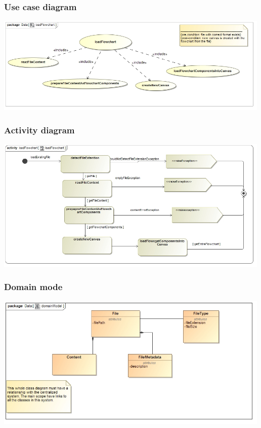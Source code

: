 \documentclass[11pt,a4paper,titlepage]{article}
\begin{document}
\subsubsection{Use case diagram}
\includegraphics[width=500px]{loadFlowchart_use_case_diagram.jpg}

\subsubsection{Activity diagram}
\includegraphics[width=500px]{loadFlowchart_activity_diagram.jpg}

\subsubsection{Domain mode}
\includegraphics[width=500px]{loadFlowchart_domain_model.jpg}
\end{document}
